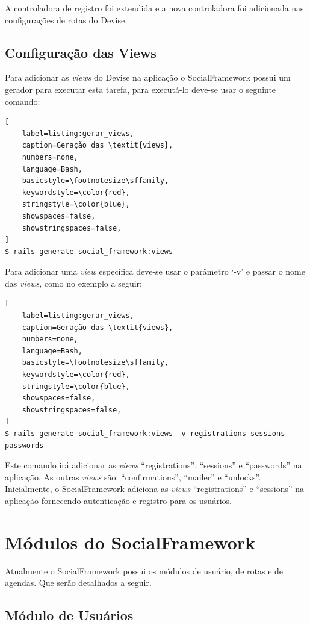 A controladora de registro foi extendida e a nova controladora foi adicionada nas configurações de rotas do Devise.

\subsection{Configuração das Views}

Para adicionar as \textit{views} do Devise na aplicação o SocialFramework possui um gerador para executar esta tarefa, para executá-lo deve-se usar o seguinte comando:

\begin{lstlisting}[
    label=listing:gerar_views,
    caption=Geração das \textit{views},
    numbers=none,
    language=Bash,
    basicstyle=\footnotesize\sffamily,
    keywordstyle=\color{red},
    stringstyle=\color{blue},
    showspaces=false,
    showstringspaces=false,
]
$ rails generate social_framework:views
\end{lstlisting}

Para adicionar uma \textit{view} específica deve-se usar o parâmetro `-v' e passar o nome das \textit{views}, como no exemplo a seguir:

\begin{lstlisting}[
    label=listing:gerar_views,
    caption=Geração das \textit{views},
    numbers=none,
    language=Bash,
    basicstyle=\footnotesize\sffamily,
    keywordstyle=\color{red},
    stringstyle=\color{blue},
    showspaces=false,
    showstringspaces=false,
]
$ rails generate social_framework:views -v registrations sessions passwords
\end{lstlisting}

Este comando irá adicionar as \textit{views} ``registrations'', ``sessions'' e ``passwords'' na aplicação. As outras \textit{views} são: ``confirmations'', ``mailer'' e ``unlocks''. Inicialmente, o SocialFramework adiciona as \textit{views} ``registrations'' e ``sessions'' na aplicação fornecendo autenticação e registro para os usuários.

\section{Módulos do SocialFramework}
\label{sec:modulos_socialframework}

Atualmente o SocialFramework possui os módulos de usuário, de rotas e de agendas. Que serão detalhados a seguir.

\subsection{Módulo de Usuários}

